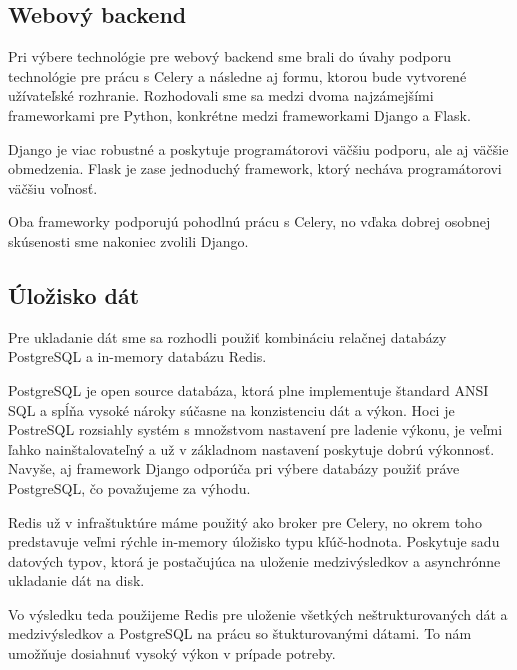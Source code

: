 \subsection{Webový backend}
Pri výbere technológie pre webový backend sme brali do úvahy podporu technológie pre prácu s Celery a následne aj formu, ktorou bude vytvorené užívateľské rozhranie. Rozhodovali sme sa medzi dvoma najzámejšími frameworkami pre Python, konkrétne medzi frameworkami Django a Flask.
\par Django je viac robustné a poskytuje programátorovi väčšiu podporu, ale aj väčšie obmedzenia. Flask je zase jednoduchý framework, ktorý necháva programátorovi väčšiu voľnosť.
\par Oba frameworky podporujú pohodlnú prácu s Celery, no vďaka dobrej osobnej skúsenosti sme nakoniec zvolili Django.

\subsection{Úložisko dát}
\label{sec:store}
Pre ukladanie dát sme sa rozhodli použiť kombináciu relačnej databázy PostgreSQL a in-memory databázu Redis. 
\par PostgreSQL je open source databáza, ktorá plne implementuje štandard ANSI SQL a spĺňa vysoké nároky súčasne na konzistenciu dát a výkon. Hoci je PostreSQL rozsiahly systém s množstvom nastavení pre ladenie výkonu, je veľmi ľahko nainštalovateľný a už v základnom nastavení poskytuje dobrú výkonnosť. Navyše, aj framework Django odporúča pri výbere databázy použiť práve PostgreSQL, čo považujeme za výhodu.
\par Redis už v infraštuktúre máme použitý ako broker pre Celery, no okrem toho predstavuje veľmi rýchle in-memory úložisko typu kľúč-hodnota. Poskytuje sadu datových typov, ktorá je postačujúca na uloženie medzivýsledkov a asynchrónne ukladanie dát na disk.
\par Vo výsledku teda použijeme Redis pre uloženie všetkých neštrukturovaných dát a medzivýsledkov a PostgreSQL na prácu so štukturovanými dátami. To nám umožňuje dosiahnuť vysoký výkon v prípade potreby.

